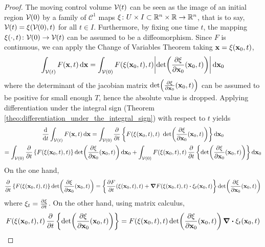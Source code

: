 \begin{proof}
	The moving control volume $\mathcal{V}_{}(t)$ can be seen as the image of an initial region $\mathcal{V}_{}(0)$ by a family of $\mathcal{C}^1$ maps $\xi \colon U \times I \subset \mathbb{R}^n \times \mathbb{R} \rightarrow \mathbb{R}^n$, that is to say, $\mathcal{V}_{}(t) = \xi(\mathcal{V}_{}(0),t)$ for all $t \in I$. Furthermore, by fixing one time $t$, the mapping $\xi(\cdot, t) \colon \mathcal{V}_{}(0) \rightarrow \mathcal{V}_{}(t)$ can be assumed to be a diffeomorphism. Since $F$ is continuous, we can apply the Change of Variables Theorem taking $\vb{x} = \xi(\vb{x}_0,t)$,
	\begin{equation*}
		\int_{\mathcal{V}(t)} F(\vb{x},t) \dd{\vb{x}} = 
		\int_{\mathcal{V}_{}(0)} F(\xi(\vb{x}_0,t), t) \abs{\det(\frac{\partial \xi}{\partial \vb{x}_0} (\vb{x}_0, t))} \dd{\vb{x}_0}
	\end{equation*}
	where the determinant of the jacobian matrix $\det(\frac{\partial \xi}{\partial \vb{x}_0} (\vb{x}_0, t))$ can be assumed to be positive for small enough $T$, hence the absolute value is dropped. Applying differentiation under the integral sign (Theorem \ref{theo:differentiation_under_the_integral_sign}) with respect to $t$ yields
	\begin{multline*}
		\frac{\dd}{\dd{t}} \int_{\mathcal{V}(t)} F(\vb{x}, t) \dd{\vb{x}} = 
		\int_{\mathcal{V}_{}(0)} \pdv{t} 
		\left\{
		F(\xi(\vb{x}_0,t), t) \ \det(\frac{\partial \xi}{\partial \vb{x}_0} (\vb{x}_0, t))
		\right\}
		\dd{\vb{x}_0} 
		\\
		= 
		\int_{\mathcal{V}_{}(0)} 
		\pdv{t} \left\{ F(\xi(\vb{x}_0,t), t) \right\} \det(\frac{\partial \xi}{\partial \vb{x}_0} (\vb{x}_0, t)) \dd{\vb{x}_0} + 
		\int_{\mathcal{V}_{}(0)} F(\xi(\vb{x}_0,t), t) \, \pdv{t} \left\{ \det(\frac{\partial \xi}{\partial \vb{x}_0} (\vb{x}_0, t)) \right\} \dd{\vb{x}_0}
	\end{multline*}
	On the one hand,
	\begin{equation*}
		\pdv{t} \left\{ F(\xi(\vb{x}_0,t), t) \right\} \det(\frac{\partial \xi}{\partial \vb{x}_0} (\vb{x}_0, t)) = 
		\left\{ 
		\frac{\partial F}{\partial t} (\xi(\vb{x}_0, t), t) + 
		\grad{F(\xi(\vb{x}_0, t), t)} \vdot \xi_t (\vb{x}_0, t)
		\right\}
		\det(\frac{\partial \xi}{\partial \vb{x}_0} (\vb{x}_0, t))
	\end{equation*}
	where $\xi_t = \pdv{\xi}{t}$. On the other hand, using matrix calculus,
	\begin{equation*}
		F(\xi(\vb{x}_0,t), t) \, \pdv{t} \left\{ \det(\frac{\partial \xi}{\partial \vb{x}_0} (\vb{x}_0, t)) \right\} = 
		F(\xi(\vb{x}_0,t), t) \det(\frac{\partial \xi}{\partial \vb{x}_0} (\vb{x}_0, t)) \, \div{\xi_t(\vb{x}_0,t)}

\end{equation*}
\end{proof}

